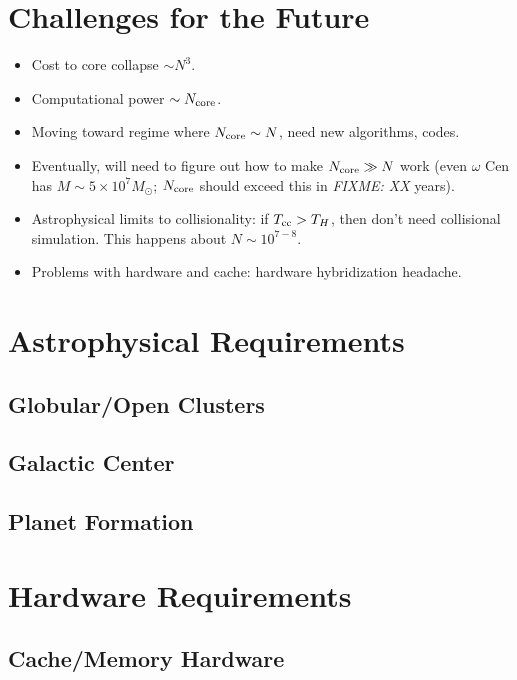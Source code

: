 \documentclass[5p,authoryear]{elsarticle}
\newcommand{\Ncore}{N_{\textnormal{core}}}
\newcommand{\Msun}{M_{\odot}}
\newcommand{\fixme}[1]{\emph{FIXME: #1}}
\begin{document}
\section{Challenges for the Future}

\begin{itemize}
\item Cost to core collapse $\sim N^3$.
\item Computational power $\sim \Ncore$.
\item Moving toward regime where $\Ncore \sim N$, need new algorithms,
  codes.
\item Eventually, will need to figure out how to make $\Ncore \gg N$
  work (even $\omega$ Cen has $M \sim 5 \times 10^7 \Msun$; $\Ncore$
  should exceed this in \fixme{XX} years).
\item Astrophysical limits to collisionality: if $T_{\textnormal{cc}}
  > T_H$, then don't need collisional simulation.  This happens about
  $N \sim 10^{7-8}$.
\item Problems with hardware and cache: hardware hybridization headache.
\end{itemize}

\section{Astrophysical Requirements}

\subsection{Globular/Open Clusters}

\subsection{Galactic Center}

\subsection{Planet Formation}

\section{Hardware Requirements}

\subsection{Cache/Memory Hardware}
\end{document}
